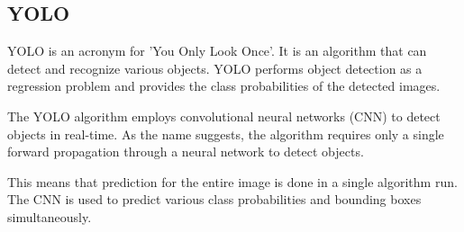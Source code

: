     \subsection{YOLO}
    YOLO is an acronym for 'You Only Look Once'. It is an algorithm that can detect and recognize various objects. 
    YOLO performs object detection as a regression problem and provides the class probabilities of the detected images.

    The YOLO algorithm employs convolutional neural networks (CNN) to detect objects in real-time. 
    As the name suggests, the algorithm requires only a single forward propagation through a neural network to detect objects.

    This means that prediction for the entire image is done in a single algorithm run. 
    The CNN is used to predict various class probabilities and bounding boxes simultaneously.
    \cite{ylalgo:yolo-algorithm}

